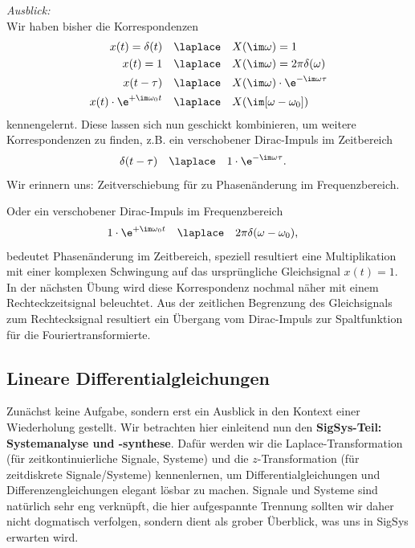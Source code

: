 



\begin{mdframed}
\textit{Ausblick:}
%
\\\noindent
Wir haben bisher die Korrespondenzen
\begin{align}
x(t)= \delta(t) &\quad \laplace \quad X(\im\omega)=1\\
x(t)= 1 &\quad \laplace \quad X(\im\omega)=2\pi \delta(\omega)\\
x(t - \tau) & \quad \laplace \quad X(\im\omega) \cdot \e^{-\im\omega \tau}\\
x(t) \cdot \e^{+\im\omega_0 t} & \quad \laplace \quad X(\im[\omega-\omega_0])\\
\end{align}
kennengelernt.
%
Diese lassen sich nun geschickt kombinieren, um weitere Korrespondenzen zu finden,
z.B. ein verschobener Dirac-Impuls im Zeitbereich
\begin{align}
\delta(t-\tau)& \quad \laplace \quad 1 \cdot \e^{-\im\omega \tau}.
\end{align}
Wir erinnern uns: Zeitverschiebung für zu Phasenänderung im Frequenzbereich.

Oder ein verschobener Dirac-Impuls im Frequenzbereich
\begin{align}
1 \cdot \e^{+\im\omega_0 t} & \quad \laplace \quad 2\pi\delta(\omega-\omega_0),
\end{align}
bedeutet Phasenänderung im Zeitbereich, speziell resultiert eine Multiplikation
mit einer komplexen Schwingung auf das ursprüngliche Gleichsignal $x(t)=1$.
%
In der nächsten Übung wird diese Korrespondenz nochmal näher mit einem
Rechteckzeitsignal beleuchtet. Aus der zeitlichen Begrenzung des Gleichsignals
zum Rechtecksignal resultiert ein Übergang vom Dirac-Impuls zur Spaltfunktion
für die Fouriertransformierte.
\end{mdframed}














\newpage
\subsection{Lineare Differentialgleichungen}
\label{sec:A7BEE9E24E}
%
Zunächst keine Aufgabe, sondern erst ein Ausblick in den Kontext einer Wiederholung
gestellt.
Wir betrachten hier einleitend nun den \textbf{SigSys-Teil: Systemanalyse und -synthese}.
Dafür werden wir die Laplace-Transformation (für zeitkontinuierliche Signale, Systeme)
und die $z$-Transformation (für zeitdiskrete Signale/Systeme) kennenlernen, um
Differentialgleichungen und Differenzengleichungen elegant lösbar zu machen.
%
Signale und Systeme sind natürlich sehr eng verknüpft, die hier aufgespannte
Trennung sollten wir daher nicht dogmatisch verfolgen, sondern dient als grober
Überblick, was uns in SigSys erwarten wird.

